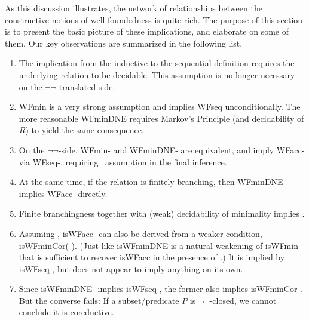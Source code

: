 As this discussion illustrates, the network of relationships between the
constructive notions of well-foundedness is quite rich.  The purpose of
this section is to present the basic picture of these implications,
and elaborate on some of them.  Our key observations are summarized
in the following list.
\begin{enumerate}
  \item The implication from the inductive to the sequential definition
  requires the underlying relation to be decidable. This assumption is no longer
  necessary on the $\lnot\lnot$-translated side.
  \item WFmin is a very strong assumption and implies WFseq unconditionally.
  The more reasonable WFminDNE requires Markov's Principle
  (and decidability of $R$) to yield the same consequence.
  \item On the $\lnot\lnot$-side, WFmin- and WFminDNE- are equivalent,
  and imply WFacc- via WFseq-, requiring {\accCor} assumption in the final inference.
  \item At the same time, if the relation is finitely branching, then WFminDNE-
  implies WFacc- directly.
  \item Finite branchingness together with (weak) decidability of minimality
  implies \accCor.
  \item Assuming \accCor, isWFacc- can also be derived from a weaker condition, isWFminCor(-).
  (Just like isWFminDNE is a natural weakening of isWFmin that is sufficient to recover isWFacc
  in the presence of {\accDNE}.)
  It is implied by isWFseq-, but does not appear to imply anything on its own.

  \item Since isWFminDNE- implies isWFseq-, the former also implies isWFminCor-.
  But the converse fails: If a subset/predicate $P$ is $\lnot\lnot$-closed,
  we cannot conclude it is coreductive.


\end{enumerate}
